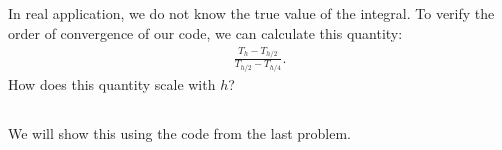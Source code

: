 \documentclass[11pt,letterpaper]{article}
\begin{document}
\subsection{}
In real application, we do not know the true value of the integral. To verify the order of convergence of our code, we can calculate this quantity:
\begin{align*}
    \frac{T_h-T_{h/2}}{T_{h/2}-T_{h/4}}.
\end{align*}
How does this quantity scale with $h$?

\subsection{}
We will show this using the code from the last problem.


\vfill
\printbibliography
\end{document}
